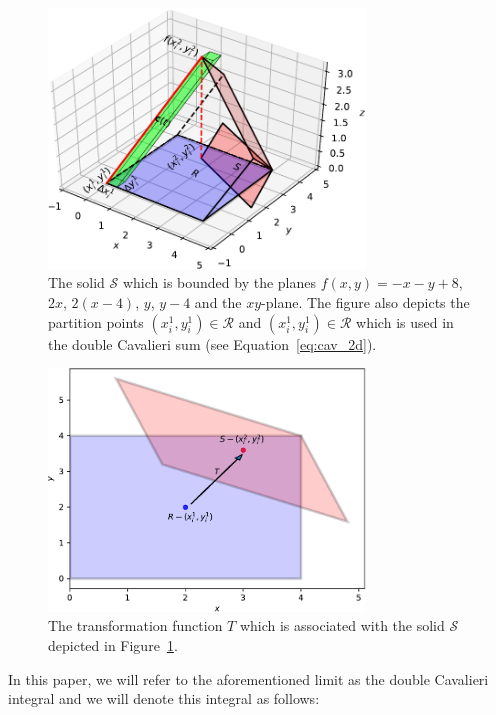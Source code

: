 \documentclass{article}
\theoremstyle{theorem}
\theoremstyle{definition}
\begin{document}
\begin{figure}[htb]
\centering
\includegraphics[width=0.75\textwidth]{prismatoid_solid.pdf}
\caption{The solid $\mathcal{S}$ which is bounded by the planes $f(x,y)=-x-y+8$, $2x$, $2(x-4)$, $y$, $y-4$ and the $xy$-plane. The figure also depicts the partition 
points $(x_i^1,y_i^1)\in\mathcal{R}$ and $(x_i^1,y_i^1)\in\mathcal{R}$ which is used in the double Cavalieri sum (see Equation~\eqref{eq:cav_2d}).}
\label{fig:prismatoid_solid}
\end{figure}

\begin{figure}[htb]
\centering
\includegraphics[width=0.75\textwidth]{prismatoid_regions.pdf}
\caption{The transformation function $T$ which is associated with the solid $\mathcal{S}$ depicted in Figure~\ref{fig:prismatoid_solid}.}
\label{fig:prismatoid_regions}
\end{figure}

\noindent
In this paper, we will refer to the aforementioned limit as the double Cavalieri integral and we will denote this integral as follows:
\end{document}

